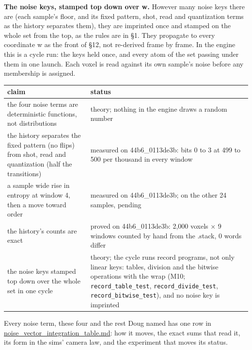 \textbf{The noise keys, stamped top down over w.} However many noise keys there are (each sample's floor, and its fixed pattern, shot, read and quantization terms as the history separates them), they are imprinted once and stamped on the whole set from the top, as the rules are in §1. They propagate to every coordinate w as the front of §12, not re-derived frame by frame. In the engine this is a cycle run: the keys held once, and every atom of the set passing under them in one launch. Each voxel is read against its own sample's noise before any membership is assigned.

{\small
\setlength{\tabcolsep}{6pt}
\begin{longtable}{>{\RaggedRight\arraybackslash}p{}>{\RaggedRight\arraybackslash}p{}}
\toprule
claim & status \\
\midrule
\endhead
the four noise terms are deterministic functions, not distributions & theory; nothing in the engine draws a random number \\
the history separates the fixed pattern (no flips) from shot, read and quantization (half the transitions) & measured on 44b6\_\allowbreak{}0113de3b: bits 0 to 3 at 499 to 500 per thousand in every window \\
a sample wide rise in entropy at window 4, then a move toward order & measured on 44b6\_\allowbreak{}0113de3b; on the other 24 samples, pending \\
the history's counts are exact & proved on 44b6\_\allowbreak{}0113de3b: 2,000 voxels × 9 windows counted by hand from the .stack, 0 words differ \\
the noise keys stamped top down over the whole set in one cycle & theory; the cycle runs record programs, not only linear keys: tables, division and the bitwise operations with the wrap (M10; \texttt{record\_\allowbreak{}table\_\allowbreak{}test}, \texttt{record\_\allowbreak{}divide\_\allowbreak{}test}, \texttt{record\_\allowbreak{}bitwise\_\allowbreak{}test}), and no noise key is imprinted \\
\bottomrule
\end{longtable}
}

Every noise term, these four and the rest Doug named has one row in \hyperref[chap:noise-vector-integration-table]{noise\_\allowbreak{}vector\_\allowbreak{}integration\_\allowbreak{}table.md}: how it moves, the exact sums that read it, its form in the sims' camera law, and the experiment that moves its status.

